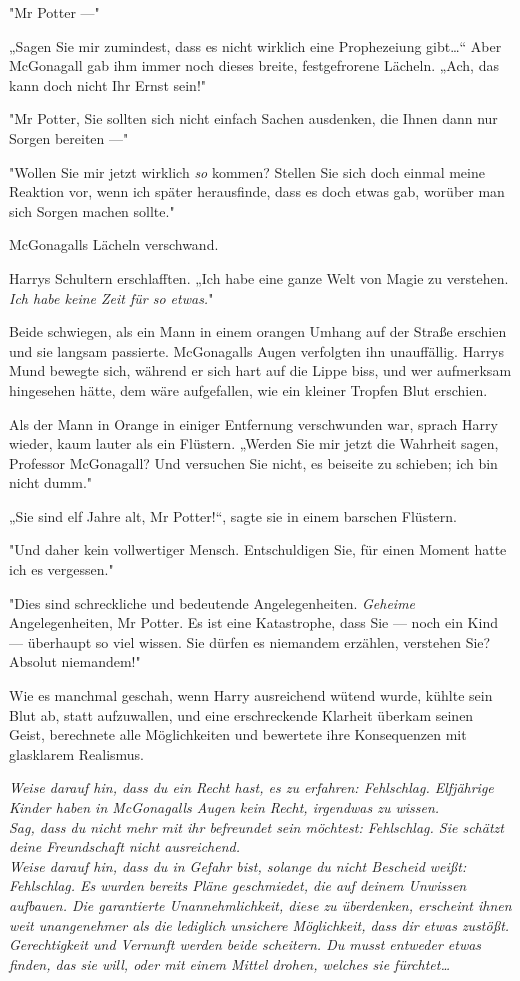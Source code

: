 {"Mr Potter ---"

„Sagen Sie mir zumindest, dass es nicht wirklich eine Prophezeiung gibt…“ Aber McGonagall gab ihm immer noch dieses breite, festgefrorene Lächeln. „Ach, das kann doch nicht Ihr Ernst sein!"

"Mr Potter, Sie sollten sich nicht einfach Sachen ausdenken, die Ihnen dann nur Sorgen bereiten ---"

"Wollen Sie mir jetzt wirklich \emph{so} kommen? Stellen Sie sich doch einmal meine Reaktion vor, wenn ich später herausfinde, dass es doch etwas gab, worüber man sich Sorgen machen sollte."

McGonagalls Lächeln verschwand.

Harrys Schultern erschlafften. „Ich habe eine ganze Welt von Magie zu verstehen. \emph{Ich habe keine Zeit für so etwas.}"

Beide schwiegen, als ein Mann in einem orangen Umhang auf der Straße erschien und sie langsam passierte. McGonagalls Augen verfolgten ihn unauffällig. Harrys Mund bewegte sich, während er sich hart auf die Lippe biss, und wer aufmerksam hingesehen hätte, dem wäre aufgefallen, wie ein kleiner Tropfen Blut erschien.

Als der Mann in Orange in einiger Entfernung verschwunden war, sprach Harry wieder, kaum lauter als ein Flüstern. „Werden Sie mir jetzt die Wahrheit sagen, Professor McGonagall? Und versuchen Sie nicht, es beiseite zu schieben; ich bin nicht dumm."

„Sie sind elf Jahre alt, Mr Potter!“, sagte sie in einem barschen Flüstern.

"Und daher kein vollwertiger Mensch. Entschuldigen Sie, für einen Moment hatte ich es vergessen."

"Dies sind schreckliche und bedeutende Angelegenheiten. \emph{Geheime} Angelegenheiten, Mr Potter. Es ist eine Katastrophe, dass Sie --- noch ein Kind --- überhaupt so viel wissen. Sie dürfen es niemandem erzählen, verstehen Sie? Absolut niemandem!"

Wie es manchmal geschah, wenn Harry ausreichend wütend wurde, kühlte sein Blut ab, statt aufzuwallen, und eine erschreckende Klarheit überkam seinen Geist, berechnete alle Möglichkeiten und bewertete ihre Konsequenzen mit glasklarem Realismus.

\emph{Weise darauf hin, dass du ein Recht hast, es zu erfahren: Fehlschlag. Elfjährige Kinder haben in McGonagalls Augen kein Recht, irgendwas zu wissen.\\ Sag, dass du nicht mehr mit ihr befreundet sein möchtest: Fehlschlag. Sie schätzt deine Freundschaft nicht ausreichend.\\ Weise darauf hin, dass du in Gefahr bist, solange du nicht Bescheid weißt: Fehlschlag. Es wurden bereits Pläne geschmiedet, die auf deinem Unwissen aufbauen. Die garantierte Unannehmlichkeit, diese zu überdenken, erscheint ihnen weit unangenehmer als die lediglich unsichere Möglichkeit, dass dir etwas zustößt.\\ Gerechtigkeit und Vernunft werden beide scheitern. Du musst entweder etwas finden, das sie will, oder mit einem Mittel drohen, welches sie fürchtet…}

}
